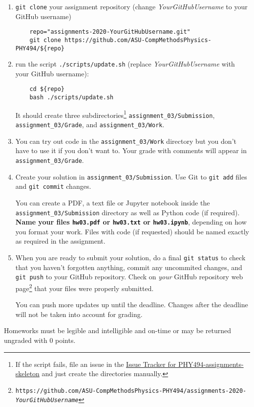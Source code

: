 \documentclass[letterpaper]{scrartcl}
\newcommand{\anumber}{3}
\newcommand{\anum}{0\anumber}
\begin{document}
\begin{enumerate}
\item \texttt{git clone} your assignment repository (change
  \emph{YourGitHubUsername} to your GitHub username)
  \begin{verbatim}
    repo="assignments-2020-YourGitHubUsername.git" 
    git clone https://github.com/ASU-CompMethodsPhysics-PHY494/${repo}
  \end{verbatim}
\item run the script
  \texttt{./scripts/update.sh} (replace \emph{YourGitHubUsername} with
  your GitHub username):
  \begin{verbatim}
    cd ${repo} 
    bash ./scripts/update.sh
  \end{verbatim}
  It should create three subdirectories\footnote{If the script fails,
    file an issue in the
    \href{https://github.com/ASU-CompMethodsPhysics-PHY494/PHY494-assignments-skeleton/issues}{Issue
      Tracker for PHY494-assignments-skeleton} and just create the
    directories manually.} \texttt{assignment\_\anum/Submission},
  \texttt{assignment\_\anum/Grade}, and
  \texttt{assignment\_\anum/Work}.
\item You can try out code in the \texttt{assignment\_\anum/Work}
  directory but you don't have to use it if you don't want to. Your
  grade with comments will appear in
  \texttt{assignment\_\anum/Grade}.
\item Create your solution in
  \texttt{assignment\_\anum/Submission}. Use Git to \texttt{git
    add} files and \texttt{git commit} changes.

  You can create a PDF, a text file or Jupyter notebook inside the
  \texttt{assignment\_\anum/Submission} directory as well as Python
  code (if required). \textbf{Name your files \texttt{hw\anum.pdf} or
    \texttt{hw\anum.txt} or \texttt{hw\anum.ipynb}}, depending on how
  you format your work. Files with code (if requested) should be named
  exactly as required in the assignment.
\item When you are ready to submit your solution, do a final
  \texttt{git status} to check that you haven't forgotten anything,
  commit any uncommited changes, and \texttt{git push} to your GitHub
  repository. Check on \emph{your} GitHub repository web
  page\footnote{\texttt{https://github.com/ASU-CompMethodsPhysics-PHY494/assignments-2020-\emph{YourGitHubUsername}}}
  that your files were properly submitted.

  You can push more updates up until the deadline. Changes after the
  deadline will not be taken into account for grading.
\end{enumerate}
Homeworks must be legible and intelligible and on-time or may  be
returned ungraded with 0 points.
\end{document}
